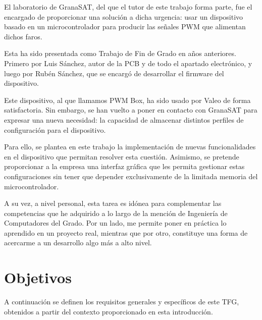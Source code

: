 El laboratorio de GranaSAT, del que el tutor de este trabajo forma parte, fue el encargado de proporcionar una solución a dicha urgencia: usar un dispositivo basado en un microcontrolador para producir las señales PWM que alimentan dichos faros.

Esta ha sido presentada como Trabajo de Fin de Grado en años anteriores. Primero por Luis Sánchez, autor de la PCB y de todo el apartado electrónico, y luego por Rubén Sánchez, que se encargó de desarrollar el firmware del dispositivo.

Este dispositivo, al que llamamos PWM Box, ha sido usado por Valeo de forma satisfactoria. Sin embargo, se han vuelto a poner en contacto con GranaSAT para expresar una nueva necesidad: la capacidad de almacenar distintos perfiles de configuración para el dispositivo.

Para ello, se plantea en este trabajo la implementación de nuevas funcionalidades en el dispositivo que permitan resolver esta cuestión. Asimismo, se pretende proporcionar a la empresa una interfaz gráfica que les permita gestionar estas configuraciones sin tener que depender exclusivamente de la limitada memoria del microcontrolador.

A su vez, a nivel personal, esta tarea es idónea para complementar las competencias que he adquirido a lo largo de la mención de Ingeniería de Computadores del Grado. Por un lado, me permite poner en práctica lo aprendido en un proyecto real, mientras que por otro, constituye una forma de acercarme a un desarrollo algo más a alto nivel.

\section{Objetivos}
\label{sec:objetivos}

A continuación se definen los requisitos generales y específicos de este TFG, obtenidos a partir del contexto proporcionado en esta introducción.

